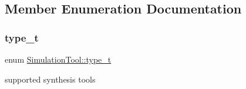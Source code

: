 \subsection{Member Enumeration Documentation}
\mbox{\label{classSimulationTool_a6f5b094bef3306e5611c0a3a9ade0a0c}} 
\subsubsection{\texorpdfstring{type\+\_\+t}{type\_t}}
{\footnotesize\ttfamily enum \hyperlink{classSimulationTool_a6f5b094bef3306e5611c0a3a9ade0a0c}{Simulation\+Tool\+::type\+\_\+t}}



supported synthesis tools 

